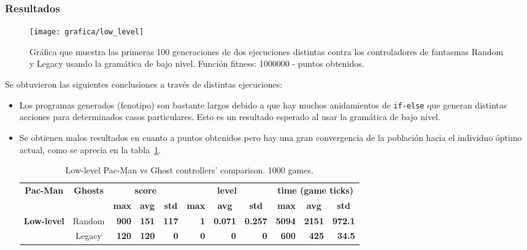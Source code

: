 \subsubsection{Resultados}
\begin{figure}[H]
\centering
\texttt{[image: grafica/low\_level]}
\caption{Gráfica que muestra las primeras 100 generaciones de dos ejecuciones distintas contra los controladores de fantasmas Random y Legacy usando la gramática de bajo nivel. Función fitness: 1000000 - puntos obtenidos.}
\end{figure}

Se obtuvieron las siguientes conclusiones a través de distintas ejecuciones:
\begin{itemize}
\item Los programas generados (fenotipo) son bastante largos debido a que hay muchos anidamientos de \texttt{if-else} que generan distintas acciones para determinados casos particulares. Esto es un resultado esperado al usar la gramática de bajo nivel.

\item Se obtienen malos resultados en cuanto a puntos obtenidos pero hay una gran convergencia de la población hacia el individuo óptimo actual, como se aprecia en la tabla~\ref{table:single_obj_low}.

\begin{table}[]
\centering
\begin{tabular}{|l|c|r|r|r|r|r|r|r|r|r|}
\hline
\multicolumn{1}{|c|}{\multirow{2}{*}{\textbf{Pac-Man}}} & \multirow{2}{*}{\textbf{Ghosts}} & \multicolumn{3}{c|}{\textbf{score}} & \multicolumn{3}{c|}{\textbf{level}} & \multicolumn{3}{c|}{\textbf{time (game ticks)}} \\ \cline{3-11} 
\multicolumn{1}{|c|}{} &  & \textbf{max} & \multicolumn{1}{c|}{\textbf{avg}} & \multicolumn{1}{c|}{\textbf{std}} & \textbf{max} & \multicolumn{1}{c|}{\textbf{avg}} & \multicolumn{1}{c|}{\textbf{std}} & \textbf{max} & \multicolumn{1}{c|}{\textbf{avg}} & \multicolumn{1}{c|}{\textbf{std}} \\ \hline
\multirow{2}{*}{\textbf{Low-level}} & Random & \multicolumn{1}{r|}{\textbf{900}} & \textbf{151} & \textbf{117} & \multicolumn{1}{r|}{\textbf{1}} & \textbf{0.071} & \textbf{0.257} & \multicolumn{1}{r|}{\textbf{5094}} & \textbf{2151} & \textbf{972.1} \\ \cline{2-11} 
 & Legacy & \multicolumn{1}{r|}{\textbf{120}} & \textbf{120} & \textbf{0} & \multicolumn{1}{r|}{\textbf{0}} & \textbf{0} & \textbf{0} & \multicolumn{1}{r|}{\textbf{600}} & \textbf{425} & \textbf{34.5} \\ \hline
\end{tabular}
\caption{Low-level Pac-Man vs Ghost controllers' comparison. 1000 games.}
\label{table:single_obj_low}
\end{table}


\end{itemize}

